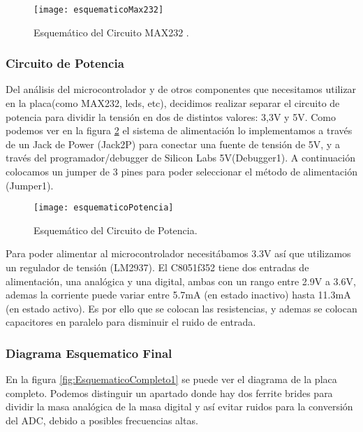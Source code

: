 \begin{figure}[H]
  \centering
  \texttt{[image: esquematicoMax232]}
  \caption{Esquemático del Circuito MAX232 .}\label{fig:esquematicoMax232}
\end{figure}


\subsubsection{Circuito de Potencia}
\label{circuito_potencia}

Del análisis del microcontrolador y de otros componentes que necesitamos utilizar en la placa(como MAX232, leds, etc), decidimos realizar separar el circuito de potencia para dividir la tensión en dos de distintos valores: 3,3V y 5V.
Como podemos ver en la figura \ref{fig:esquematicoPotencia} el sistema de alimentación lo implementamos a través de un Jack de Power (Jack2P) para conectar una fuente de tensión de 5V, y a través del programador/debugger de Silicon Labs 5V(Debugger1). A continuación colocamos un jumper de 3 pines para poder seleccionar el método de alimentación (Jumper1).

\begin{figure}[H]
  \centering
  \texttt{[image: esquematicoPotencia]}
  \caption{Esquemático del Circuito de Potencia.}\label{fig:esquematicoPotencia}
\end{figure}

Para poder alimentar al microcontrolador necesitábamos 3.3V así que utilizamos un regulador de tensión (LM2937). El C8051f352 tiene dos entradas de alimentación, una analógica y una digital, ambas con un rango entre 2.9V a 3.6V, ademas la corriente puede variar entre 5.7mA (en estado inactivo) hasta 11.3mA (en estado activo). Es por ello que se colocan las resistencias, y ademas se colocan capacitores en paralelo para disminuir el ruido de entrada.


\subsubsection{Diagrama Esquematico Final}
\label{esquematico_final_1}

En la figura \ref{fig:EsquematicoCompleto1} se puede ver el diagrama de la placa completo. 
Podemos distinguir un apartado donde hay dos ferrite brides para dividir la masa analógica de la masa digital y así evitar ruidos para la conversión del ADC, debido a posibles frecuencias altas.


